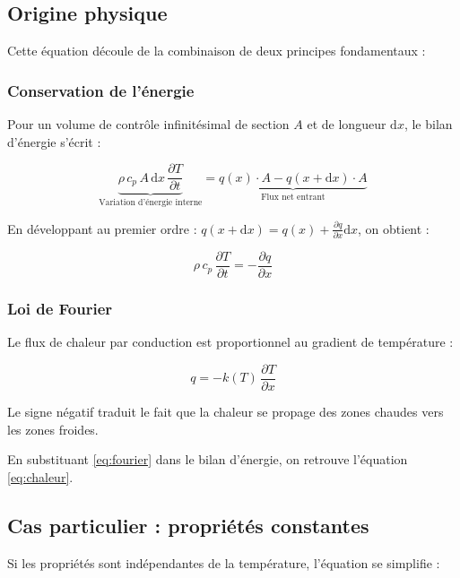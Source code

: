 \documentclass[11pt,a4paper]{article}
\newcommand{\dd}{\mathrm{d}}
\begin{document}
\subsection{Origine physique}

Cette équation découle de la combinaison de deux principes fondamentaux :

\subsubsection{Conservation de l'énergie}

Pour un volume de contrôle infinitésimal de section $A$ et de longueur $\dd x$, le bilan d'énergie s'écrit :

\begin{equation}
\underbrace{\rho \, c_p \, A \, \dd x \, \frac{\partial T}{\partial t}}_{\text{Variation d'énergie interne}} = \underbrace{q(x) \cdot A - q(x+\dd x) \cdot A}_{\text{Flux net entrant}}
\end{equation}

En développant au premier ordre : $q(x+\dd x) = q(x) + \frac{\partial q}{\partial x} \dd x$, on obtient :

\begin{equation}
\rho \, c_p \, \frac{\partial T}{\partial t} = -\frac{\partial q}{\partial x}
\end{equation}

\subsubsection{Loi de Fourier}

Le flux de chaleur par conduction est proportionnel au gradient de température :

\begin{equation}
q = -k(T) \, \frac{\partial T}{\partial x}
\label{eq:fourier}
\end{equation}

Le signe négatif traduit le fait que la chaleur se propage des zones chaudes vers les zones froides.

En substituant \eqref{eq:fourier} dans le bilan d'énergie, on retrouve l'équation \eqref{eq:chaleur}.

\subsection{Cas particulier : propriétés constantes}

Si les propriétés sont indépendantes de la température, l'équation se simplifie :
\end{document}
